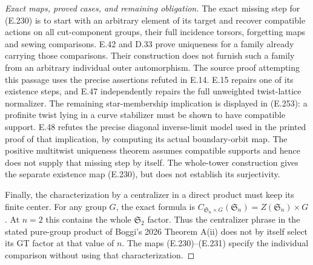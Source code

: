 \begin{proof}[Exact maps, proved cases, and remaining obligation]
The exact missing step for (E.230) is to
start with an arbitrary element of its
target and recover compatible actions on
all cut-component groups, their full
incidence torsors, forgetting maps and
sewing comparisons.  E.42 and D.33 prove
uniqueness for a family already carrying
those comparisons.  Their construction
does not furnish such a family from an
arbitrary individual outer automorphism.
The source proof attempting this passage
uses the precise assertions refuted in E.14.
E.15 repairs one of its existence steps,
and E.47 independently repairs the full
unweighted twist-lattice normalizer.
The remaining star-membership implication
is displayed in (E.253): a profinite twist
lying in a curve stabilizer must be shown
to have compatible support. E.48 refutes
the precise diagonal inverse-limit model
used in the printed proof of that implication,
by computing its actual boundary-orbit map.
The positive multitwist uniqueness theorem
assumes compatible supports and hence does
not supply that missing step by itself.
The whole-tower construction gives the
separate existence map (E.230), but does
not establish its surjectivity.

Finally, the characterization by a
centralizer in a direct product must
keep its finite center.  For any group
$G$, the exact formula is
$C_{\mathfrak S_n\times G}(\mathfrak S_n)
=Z(\mathfrak S_n)\times G$.
At $n=2$ this contains the whole
$\mathfrak S_2$ factor.  Thus the
centralizer phrase in the stated
pure-group product of Boggi's 2026
Theorem A(ii) does not by itself select
its GT factor at that value of $n$.
The maps (E.230)--(E.231) specify the
individual comparison without using
that characterization.
\end{proof}
